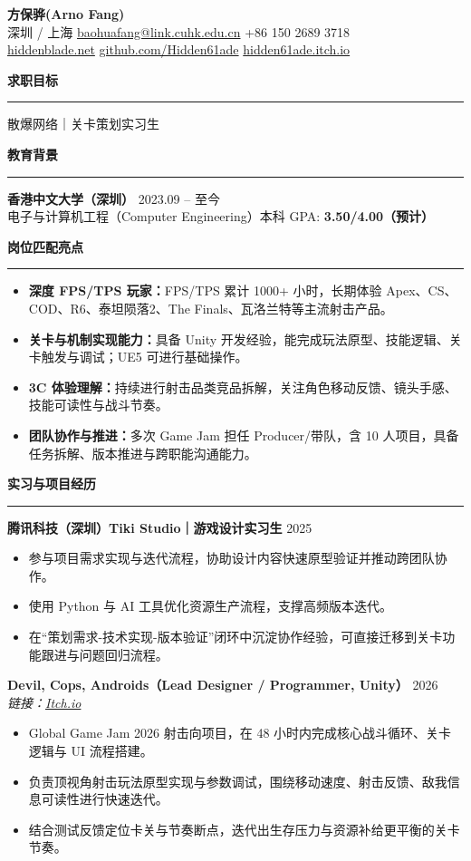 \documentclass[11pt,a4paper]{ctexart}
\newcommand{\head}[1]{\vspace{2pt}\textbf{\large #1}\vspace{2pt}\hrule\vspace{4pt}}
\begin{document}
\begin{center}
{\LARGE \textbf{方保骅\;\;(Arno Fang)}}\\
深圳 / 上海 \quad
\href{mailto:baohuafang@link.cuhk.edu.cn}{baohuafang@link.cuhk.edu.cn} \quad
+86 150 2689 3718 \\
\href{https://hiddenblade.net}{hiddenblade.net} \quad
\href{https://github.com/Hidden61ade}{github.com/Hidden61ade} \quad
\href{https://hidden61ade.itch.io/}{hidden61ade.itch.io}
\end{center}

\head{求职目标}
散爆网络｜关卡策划实习生

\head{教育背景}
\textbf{香港中文大学（深圳）} \hfill 2023.09 -- 至今\\
电子与计算机工程（Computer Engineering）本科 \hfill GPA: \textbf{3.50/4.00（预计）}

\head{岗位匹配亮点}
\begin{itemize}[leftmargin=1.3em,itemsep=2pt,topsep=2pt]
  \item \textbf{深度 FPS/TPS 玩家：}FPS/TPS 累计 1000+ 小时，长期体验 Apex、CS、COD、R6、泰坦陨落2、The Finals、瓦洛兰特等主流射击产品。
  \item \textbf{关卡与机制实现能力：}具备 Unity 开发经验，能完成玩法原型、技能逻辑、关卡触发与调试；UE5 可进行基础操作。
  \item \textbf{3C 体验理解：}持续进行射击品类竞品拆解，关注角色移动反馈、镜头手感、技能可读性与战斗节奏。
  \item \textbf{团队协作与推进：}多次 Game Jam 担任 Producer/带队，含 10 人项目，具备任务拆解、版本推进与跨职能沟通能力。
\end{itemize}

\head{实习与项目经历}
\textbf{腾讯科技（深圳）Tiki Studio｜游戏设计实习生} \hfill 2025\\
\begin{itemize}[leftmargin=1.3em,itemsep=2pt,topsep=2pt]
  \item 参与项目需求实现与迭代流程，协助设计内容快速原型验证并推动跨团队协作。
  \item 使用 Python 与 AI 工具优化资源生产流程，支撑高频版本迭代。
  \item 在“策划需求-技术实现-版本验证”闭环中沉淀协作经验，可直接迁移到关卡功能跟进与问题回归流程。
\end{itemize}

\textbf{Devil, Cops, Androids（Lead Designer / Programmer, Unity）} \hfill 2026\\
\textit{链接：\href{https://synapse75.itch.io/devilcopsandroids}{Itch.io}}\\
\begin{itemize}[leftmargin=1.3em,itemsep=2pt,topsep=2pt]
  \item Global Game Jam 2026 射击向项目，在 48 小时内完成核心战斗循环、关卡逻辑与 UI 流程搭建。
  \item 负责顶视角射击玩法原型实现与参数调试，围绕移动速度、射击反馈、敌我信息可读性进行快速迭代。
  \item 结合测试反馈定位卡关与节奏断点，迭代出生存压力与资源补给更平衡的关卡节奏。
\end{itemize}
\end{document}

